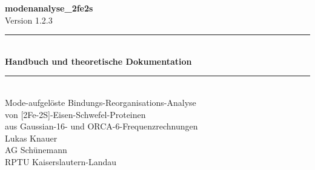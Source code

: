 \documentclass[11pt,a4paper,twoside]{article}
\theoremstyle{remark}
\begin{document}
\begin{titlepage}
  \begin{center}
    \vspace*{2cm}
    {\Huge\bfseries\color{accent} modenanalyse\_2fe2s}\\[0.4cm]
    {\large Version 1.2.3}\\[2cm]

    \rule{\textwidth}{0.4pt}\\[0.3cm]
    {\LARGE\bfseries Handbuch und theoretische Dokumentation}\\[0.3cm]
    \rule{\textwidth}{0.4pt}\\[1cm]

    {\large
      Mode-aufgel\"oste Bindungs-Reorganisations-Analyse\\
      von {[}2Fe-2S{]}-Eisen-Schwefel-Proteinen\\
      aus Gaussian-16- und ORCA-6-Frequenzrechnungen
    }\\[1.5cm]

    {\large
      Lukas Knauer\\
      AG Sch\"unemann\\
      RPTU Kaiserslautern-Landau
    }\\[1.5cm]


\end{center}
\end{titlepage}
\end{document}
